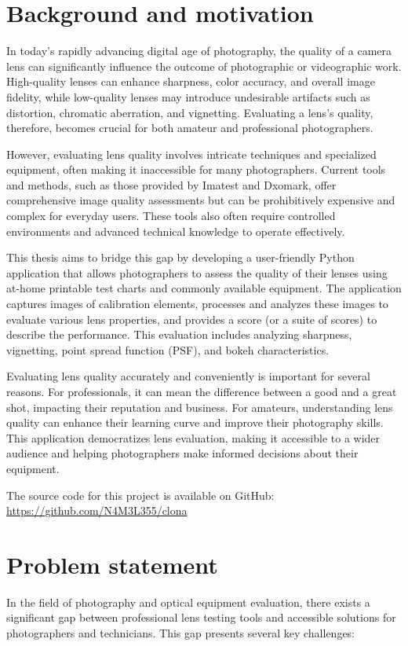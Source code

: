 \section*{Background and motivation}
In today's rapidly advancing digital age of photography, the quality of a camera lens can significantly influence the outcome of photographic or videographic work. High-quality lenses can enhance sharpness, color accuracy, and overall image fidelity, while low-quality lenses may introduce undesirable artifacts such as distortion, chromatic aberration, and vignetting. Evaluating a lens's quality, therefore, becomes crucial for both amateur and professional photographers.

However, evaluating lens quality involves intricate techniques and specialized equipment, often making it inaccessible for many photographers. Current tools and methods, such as those provided by Imatest and Dxomark, offer comprehensive image quality assessments but can be prohibitively expensive and complex for everyday users. These tools also often require controlled environments and advanced technical knowledge to operate effectively.

This thesis aims to bridge this gap by developing a user-friendly Python application that allows photographers to assess the quality of their lenses using at-home printable test charts and commonly available equipment. The application captures images of calibration elements, processes and analyzes these images to evaluate various lens properties, and provides a score (or a suite of scores) to describe the performance. This evaluation includes analyzing sharpness, vignetting, point spread function (PSF), and bokeh characteristics.


Evaluating lens quality accurately and conveniently is important for several reasons. For professionals, it can mean the difference between a good and a great shot, impacting their reputation and business. For amateurs, understanding lens quality can enhance their learning curve and improve their photography skills. This application democratizes lens evaluation, making it accessible to a wider audience and helping photographers make informed decisions about their equipment.



The source code for this project is available on GitHub: \url{https://github.com/N4M3L355/clona}
\section*{Problem statement}
In the field of photography and optical equipment evaluation, there exists a significant gap between professional lens testing tools and accessible solutions for photographers and technicians. This gap presents several key challenges:

